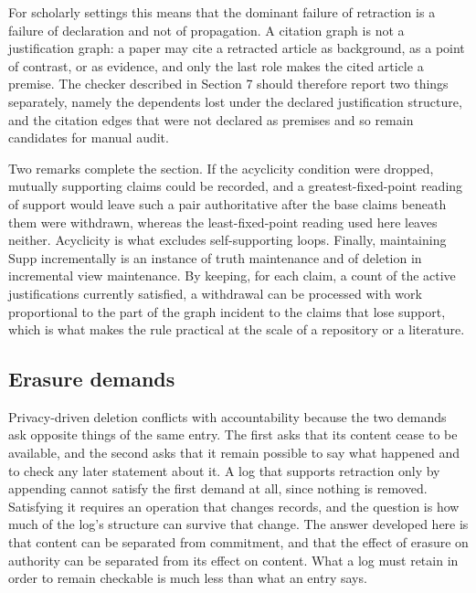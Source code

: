 \documentclass[11pt]{article}
\theoremstyle{plain}
\theoremstyle{definition}
\theoremstyle{remark}
\begin{document}
For scholarly settings this means that the dominant failure of retraction is a failure of declaration and not of propagation. A citation graph is not a justification graph: a paper may cite a retracted article as background, as a point of contrast, or as evidence, and only the last role makes the cited article a premise. The checker described in Section 7 should therefore report two things separately, namely the dependents lost under the declared justification structure, and the citation edges that were not declared as premises and so remain candidates for manual audit.

Two remarks complete the section. If the acyclicity condition were dropped, mutually supporting claims could be recorded, and a greatest-fixed-point reading of support would leave such a pair authoritative after the base claims beneath them were withdrawn, whereas the least-fixed-point reading used here leaves neither. Acyclicity is what excludes self-supporting loops. Finally, maintaining $\mathrm{Supp}$ incrementally is an instance of truth maintenance and of deletion in incremental view maintenance. By keeping, for each claim, a count of the active justifications currently satisfied, a withdrawal can be processed with work proportional to the part of the graph incident to the claims that lose support, which is what makes the rule practical at the scale of a repository or a literature.

\subsection{Erasure demands}
Privacy-driven deletion conflicts with accountability because the two demands ask opposite things of the same entry. The first asks that its content cease to be available, and the second asks that it remain possible to say what happened and to check any later statement about it. A log that supports retraction only by appending cannot satisfy the first demand at all, since nothing is removed. Satisfying it requires an operation that changes records, and the question is how much of the log's structure can survive that change. The answer developed here is that content can be separated from commitment, and that the effect of erasure on authority can be separated from its effect on content. What a log must retain in order to remain checkable is much less than what an entry says.
\end{document}

